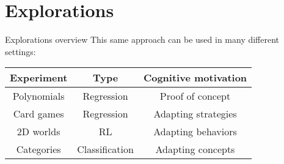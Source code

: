 \documentclass{beamer}
\begin{document}

\section{Explorations}

\begin{frame}{Explorations overview}
This same approach can be used in many different settings: 
\begin{table}
\center
\begin{tabular}{|c|c|c|}
\hline
Experiment & Type & Cognitive motivation \\
\hline
\color{lightgray} Polynomials & \color{lightgray} Regression & \color{lightgray} Proof of concept \\
Card games & Regression & Adapting strategies \\
2D worlds & RL & Adapting behaviors \\
Categories & Classification & Adapting concepts \\
\hline
\end{tabular}
\end{table}
\end{frame}

\end{document}
